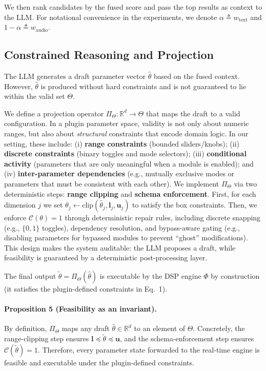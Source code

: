 \documentclass{article}
\begin{document}
We then rank candidates by the fused score and pass the top results as context to the LLM. For notational convenience in the experiments, we denote $\alpha \triangleq w_{\text{text}}$ and $1-\alpha \triangleq w_{\text{audio}}$.

\subsection{Constrained Reasoning and Projection}
\label{ssec:param_constraints}

The LLM generates a draft parameter vector $\hat{\theta}$ based on the fused context. However, $\hat{\theta}$ is produced without hard constraints and is not guaranteed to lie within the valid set $\Theta$.

We define a projection operator $\Pi_{\Theta}: \mathbb{R}^d \to \Theta$ that maps the draft to a valid configuration. In a plugin parameter space, validity is not only about numeric ranges, but also about \textit{structural} constraints that encode domain logic. In our setting, these include: (i) \textbf{range constraints} (bounded sliders/knobs); (ii) \textbf{discrete constraints} (binary toggles and mode selectors); (iii) \textbf{conditional activity} (parameters that are only meaningful when a module is enabled); and (iv) \textbf{inter-parameter dependencies} (e.g., mutually exclusive modes or parameters that must be consistent with each other).
We implement $\Pi_{\Theta}$ via two deterministic steps: \textbf{range clipping} and \textbf{schema enforcement}. First, for each dimension $j$ we set $\theta_j \leftarrow \text{clip}(\hat{\theta}_j, \mathbf{l}_j, \mathbf{u}_j)$ to satisfy the box constraints. Then, we enforce $\mathcal{C}(\theta)=1$ through deterministic repair rules, including discrete snapping (e.g., $\{0,1\}$ toggles), dependency resolution, and bypass-aware gating (e.g., disabling parameters for bypassed modules to prevent ``ghost'' modifications). This design makes the system auditable: the LLM proposes a draft, while feasibility is guaranteed by a deterministic post-processing layer.

The final output $\tilde{\theta} = \Pi_{\Theta}(\hat{\theta})$ is executable by the DSP engine $\Phi$ by construction (it satisfies the plugin-defined constraints in Eq.~1).

\paragraph{Proposition 5 (Feasibility as an invariant).}
By definition, $\Pi_{\Theta}$ maps any draft $\hat{\theta}\in\mathbb{R}^d$ to an element of $\Theta$. Concretely, the range-clipping step ensures $\mathbf{l}\preceq\tilde{\theta}\preceq\mathbf{u}$, and the schema-enforcement step ensures $\mathcal{C}(\tilde{\theta})=1$. Therefore, every parameter state forwarded to the real-time engine is feasible and executable under the plugin-defined constraints.
\end{document}
